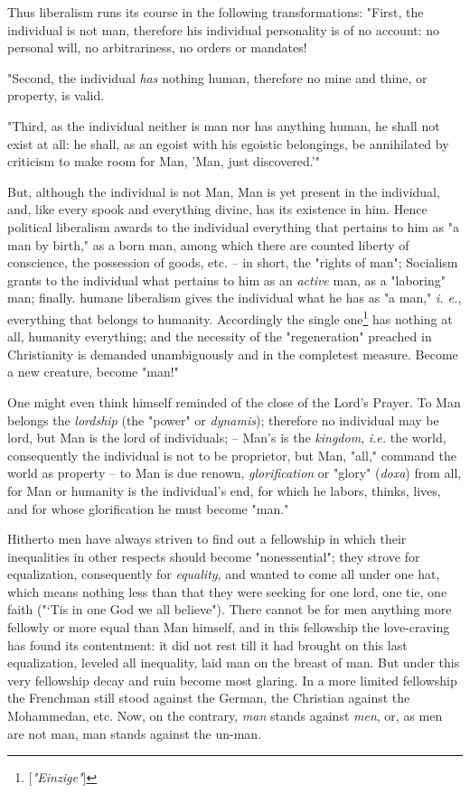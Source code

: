 \documentclass[a4paper]{book}
\begin{document}
Thus liberalism runs its course in the following transformations: "{}First, 
the individual is not man, therefore his individual personality is of no 
account: no personal will, no arbitrariness, no orders or mandates!

"{}Second, the individual \textit{has} nothing human, therefore no mine and 
thine, or property, is valid.

"{}Third, as the individual neither is man nor has anything human, he shall 
not exist at all: he shall, as an egoist with his egoistic belongings, be 
annihilated by criticism to make room for Man, 'Man, just discovered.'"{}

But, although the individual is not Man, Man is yet present in the individual, 
and, like every spook and everything divine, has its existence in him. Hence 
political liberalism awards to the individual everything that pertains to him 
as "{}a man by birth,"{} as a born man, among which there are counted liberty 
of conscience, the possession of goods, etc. -- in short, the "{}rights of 
man"{}; Socialism grants to the individual what pertains to him as an 
\textit{active} man, as a "{}laboring"{} man; finally. humane liberalism gives 
the individual what he has as "{}a man,"{} \textit{i. e.}, everything that 
belongs to humanity. Accordingly the single 
one\footnote{[\textit{"{}Einzige"{}}]} has nothing at all, humanity 
everything; and the necessity of the "{}regeneration"{} preached in 
Christianity is demanded unambiguously and in the completest measure. Become a 
new creature, become "{}man!"{}

One might even think himself reminded of the close of the Lord's Prayer. To 
Man belongs the \textit{lordship} (the "{}power"{} or \textit{dynamis}); 
therefore no individual may be lord, but Man is the lord of individuals; -- 
Man's is the \textit{kingdom}, \textit{i.e.} the world, consequently the 
individual is not to be proprietor, but Man, "{}all,"{} command the world as 
property -- to Man is due renown, \textit{glorification} or "{}glory"{} 
(\textit{doxa}) from all, for Man or humanity is the individual's end, for 
which he labors, thinks, lives, and for whose glorification he must become 
"{}man."{}

Hitherto men have always striven to find out a fellowship in which their 
inequalities in other respects should become "{}nonessential"{}; they strove 
for equalization, consequently for \textit{equality}, and wanted to come all 
under one hat, which means nothing less than that they were seeking for one 
lord, one tie, one faith ("{}`Tis in one God we all believe"{}). There cannot 
be for men anything more fellowly or more equal than Man himself, and in this 
fellowship the love-craving has found its contentment: it did not rest till it 
had brought on this last equalization, leveled all inequality, laid man on the 
breast of man. But under this very fellowship decay and ruin become most 
glaring. In a more limited fellowship the Frenchman still stood against the 
German, the Christian against the Mohammedan, etc. Now, on the contrary, 
\textit{man} stands against \textit{men}, or, as men are not man, man stands 
against the un-man.
\end{document}
